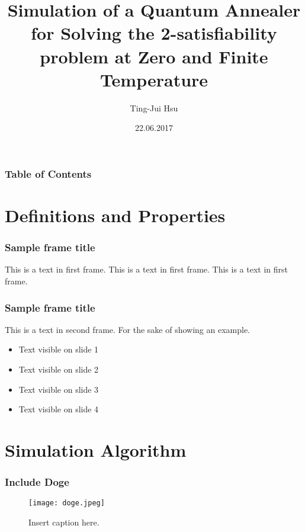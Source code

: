 \documentclass{beamer}
\title{Simulation of a Quantum Annealer for Solving the 2-satisfiability problem at Zero and Finite Temperature}
\author{Ting-Jui Hsu}
\institute{Quantum Information Group}
\date{22.06.2017}
\begin{document}
\frame{\titlepage}


\begin{frame}
	\frametitle{Table of Contents}
	\tableofcontents
\end{frame}



\section{Definitions and Properties}
\begin{frame}
\frametitle{Sample frame title}
This is a text in first frame. This is a text in first frame. This is a text in first frame.
\end{frame}




\begin{frame}
	\frametitle{Sample frame title}
	This is a text in second frame. 
	For the sake of showing an example.
	
	\begin{itemize}
		\item<1-> Text visible on slide 1
		\item<2-> Text visible on slide 2
		\item<3-> Text visible on slide 3
		\item<4-> Text visible on slide 4
	\end{itemize}
	
\end{frame}
\section{Simulation Algorithm}
\begin{frame}
	\frametitle{Include Doge}
	\begin{figure}[h]
		\centering
		\texttt{[image: doge.jpeg]}
		\caption{Insert caption here.}
		
	\end{figure}
\end{frame}
\end{document}
